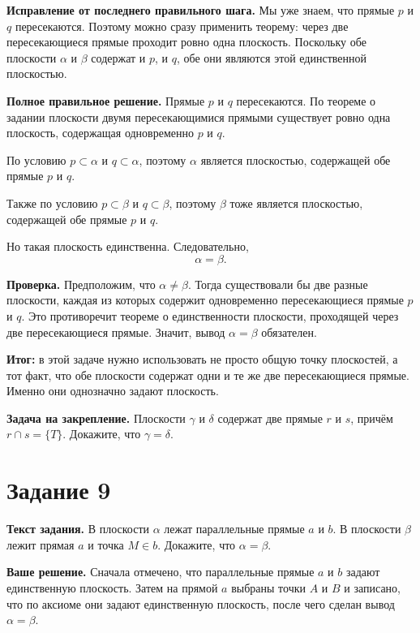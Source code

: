 \documentclass[12pt,a4paper]{article}
\begin{document}
\textbf{Исправление от последнего правильного шага.}
Мы уже знаем, что прямые $p$ и $q$ пересекаются. Поэтому можно сразу применить теорему: через две пересекающиеся прямые проходит ровно одна плоскость. Поскольку обе плоскости $\alpha$ и $\beta$ содержат и $p$, и $q$, обе они являются этой единственной плоскостью.

\textbf{Полное правильное решение.}
Прямые $p$ и $q$ пересекаются. По теореме о задании плоскости двумя пересекающимися прямыми существует ровно одна плоскость, содержащая одновременно $p$ и $q$.

По условию $p\subset\alpha$ и $q\subset\alpha$, поэтому $\alpha$ является плоскостью, содержащей обе прямые $p$ и $q$.

Также по условию $p\subset\beta$ и $q\subset\beta$, поэтому $\beta$ тоже является плоскостью, содержащей обе прямые $p$ и $q$.

Но такая плоскость единственна. Следовательно,
\[
\alpha=\beta.
\]

\textbf{Проверка.}
Предположим, что $\alpha\ne\beta$. Тогда существовали бы две разные плоскости, каждая из которых содержит одновременно пересекающиеся прямые $p$ и $q$. Это противоречит теореме о единственности плоскости, проходящей через две пересекающиеся прямые. Значит, вывод $\alpha=\beta$ обязателен.

\textcolor{teal!60!black}{\textbf{Итог:}} в этой задаче нужно использовать не просто общую точку плоскостей, а тот факт, что обе плоскости содержат одни и те же две пересекающиеся прямые. Именно они однозначно задают плоскость.

\textbf{Задача на закрепление.}
Плоскости $\gamma$ и $\delta$ содержат две прямые $r$ и $s$, причём $r\cap s=\{T\}$. Докажите, что $\gamma=\delta$.

\newpage
{}\label{task:9}
\section*{Задание 9}

\textbf{Текст задания.}
В плоскости $\alpha$ лежат параллельные прямые $a$ и $b$. В плоскости $\beta$ лежит прямая $a$ и точка $M\in b$. Докажите, что $\alpha=\beta$.

\textbf{Ваше решение.}
Сначала отмечено, что параллельные прямые $a$ и $b$ задают единственную плоскость. Затем на прямой $a$ выбраны точки $A$ и $B$ и записано, что по аксиоме они задают единственную плоскость, после чего сделан вывод $\alpha=\beta$.
\end{document}
